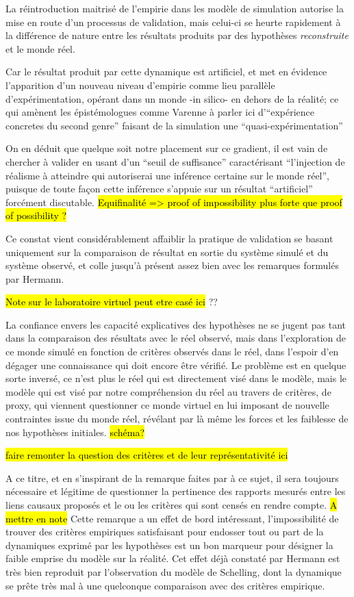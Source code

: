 La réintroduction maitrisé de l'empirie dans les modèle de simulation autorise la mise en route d'un processus de validation, mais celui-ci se heurte rapidement à la différence de nature entre les résultats produits par des hypothèses \textit{reconstruite} et le monde réel.

Car le résultat produit par cette dynamique est artificiel, et met en évidence l'apparition d'un nouveau niveau d'empirie comme lieu parallèle d'expérimentation, opérant dans un monde -in silico- en dehors de la réalité; ce qui amènent les épistémologues comme Varenne à parler ici d'\enquote{expérience concretes du second genre} faisant de la simulation une \enquote{quasi-expérimentation} \autocites{Varenne2001, Varenne2007, Phan2008 }

On en déduit que quelque soit notre placement sur ce gradient, il est vain de chercher à valider en usant d'un \enquote{seuil de suffisance} caractérisant \enquote{l'injection de réalisme à atteindre qui autoriserai une inférence certaine sur le monde réel}, puisque de toute façon cette inférence s'appuie sur un résultat \enquote{artificiel} forcément discutable.     \hl{Equifinalité => proof of impossibility plus forte que proof of possibility ?}

Ce constat vient considérablement affaiblir la pratique de validation se basant uniquement sur la comparaison de résultat en sortie du système simulé et du système observé, et colle jusqu'à présent assez bien avec les remarques formulés par Hermann.

\hl{Note sur le laboratoire virtuel peut etre casé ici} ?? 

La confiance envers les capacité explicatives des hypothèses ne se jugent pas tant dans la comparaison des résultats avec le réel observé, mais dans l'exploration de ce monde simulé en fonction de critères observés dans le réel, dans l'espoir d'en dégager une connaissance qui doit encore être vérifié. Le problème est en quelque sorte inversé, ce n'est plus le réel qui est directement visé dans le modèle, mais le modèle qui est visé par notre compréhension du réel au travers de critères, de proxy, qui viennent questionner ce monde virtuel en lui imposant de nouvelle contraintes issue du monde réel, révélant par là même les forces et les faiblesse de nos hypothèses initiales. \hl{schéma?}

\hl{ faire remonter la question des critères et de leur représentativité ici }

A ce titre, et en s'inspirant de la remarque faites par \textcite{Bulle2005} à ce sujet, il sera toujours nécessaire et légitime de questionner la pertinence des rapports mesurés entre les liens causaux proposés et le ou les critères qui sont censés en rendre compte. \hl{A mettre en note} Cette remarque a un effet de bord intéressant, l'impossibilité de trouver des critères empiriques satisfaisant pour endosser tout ou part de la dynamiques exprimé par les hypothèses est un bon marqueur pour désigner la faible emprise du modèle sur la réalité. Cet effet déjà constaté par Hermann est très bien reproduit par l'observation du modèle de Schelling, dont la dynamique se prête très mal à une quelconque comparaison avec des critères empirique.


